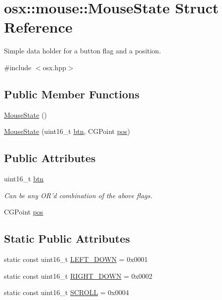 \hypertarget{structosx_1_1mouse_1_1_mouse_state}{\section{osx\-:\-:mouse\-:\-:Mouse\-State Struct Reference}
\label{structosx_1_1mouse_1_1_mouse_state}
}


Simple data holder for a button flag and a position.  




{\ttfamily \#include $<$osx.\-hpp$>$}

\subsection*{Public Member Functions}
\begin{DoxyCompactItemize}
\item 
\hyperlink{structosx_1_1mouse_1_1_mouse_state_a0df57029fed62314b2cde044a301e560}{Mouse\-State} ()
\item 
\hyperlink{structosx_1_1mouse_1_1_mouse_state_a94a0908393dad3eac2a6ee377f936c7a}{Mouse\-State} (uint16\-\_\-t \hyperlink{structosx_1_1mouse_1_1_mouse_state_a2463a45ed53f3952c6d9a544a5dd680b}{btn}, C\-G\-Point \hyperlink{structosx_1_1mouse_1_1_mouse_state_a046eeff3d384ad60cf22e3650b5ee0a4}{pos})
\end{DoxyCompactItemize}
\subsection*{Public Attributes}
\begin{DoxyCompactItemize}
\item 
uint16\-\_\-t \hyperlink{structosx_1_1mouse_1_1_mouse_state_a2463a45ed53f3952c6d9a544a5dd680b}{btn}
\begin{DoxyCompactList}\small\item\em Can be any O\-R'd combination of the above flags. \end{DoxyCompactList}\item 
C\-G\-Point \hyperlink{structosx_1_1mouse_1_1_mouse_state_a046eeff3d384ad60cf22e3650b5ee0a4}{pos}
\end{DoxyCompactItemize}
\subsection*{Static Public Attributes}
\begin{DoxyCompactItemize}
\item 
static const uint16\-\_\-t \hyperlink{structosx_1_1mouse_1_1_mouse_state_a9490a7acba9726f815fa3246985da50b}{L\-E\-F\-T\-\_\-\-D\-O\-W\-N} = 0x0001
\item 
static const uint16\-\_\-t \hyperlink{structosx_1_1mouse_1_1_mouse_state_a23bf52536a66f3ca8f3d1cebb0f401ee}{R\-I\-G\-H\-T\-\_\-\-D\-O\-W\-N} = 0x0002
\item 
static const uint16\-\_\-t \hyperlink{structosx_1_1mouse_1_1_mouse_state_a09e8666395882198d1bca0a745f216df}{S\-C\-R\-O\-L\-L} = 0x0004
\end{DoxyCompactItemize}
